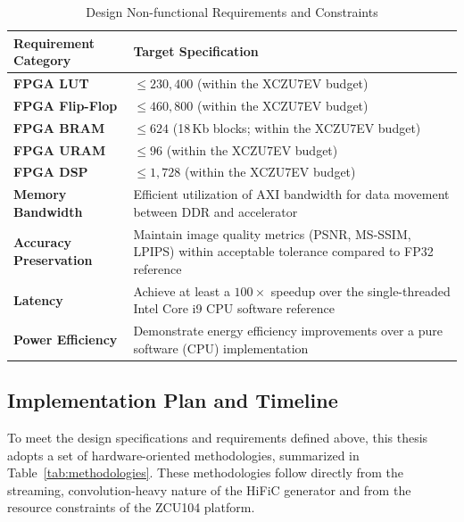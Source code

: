 \begin{table}[H]
\centering
\caption{Design Non-functional Requirements and Constraints}
\label{tab:nonfunctional_req}
\begin{tabularx}{\textwidth}{|>{\raggedright\arraybackslash}p{}|X|}
\hline
\textbf{Requirement Category} & \textbf{Target Specification} \\
\hline
\textbf{FPGA LUT} & $\leq 230{,}400$ (within the XCZU7EV budget) \\
\hline
\textbf{FPGA Flip-Flop} & $\leq 460{,}800$ (within the XCZU7EV budget) \\
\hline
\textbf{FPGA BRAM} & $\leq 624$ (18\,Kb blocks; within the XCZU7EV budget) \\
\hline
\textbf{FPGA URAM} & $\leq 96$ (within the XCZU7EV budget) \\
\hline
\textbf{FPGA DSP} & $\leq 1{,}728$ (within the XCZU7EV budget) \\
\hline
\textbf{Memory Bandwidth} & Efficient utilization of AXI bandwidth for data movement between DDR and accelerator \\
\hline
\textbf{Accuracy Preservation} & Maintain image quality metrics (PSNR, MS-SSIM, LPIPS) within acceptable tolerance compared to FP32 reference \\
\hline
\textbf{Latency} & Achieve at least a $100\times$ speedup over the single-threaded Intel Core i9 CPU software reference \\
\hline
\textbf{Power Efficiency} & Demonstrate energy efficiency improvements over a pure software (CPU) implementation \\
\hline
\end{tabularx}
\end{table}

\subsection{Implementation Plan and Timeline}

To meet the design specifications and requirements defined above, this thesis adopts a set of hardware-oriented methodologies, summarized in Table~\ref{tab:methodologies}. These methodologies follow directly from the streaming, convolution-heavy nature of the HiFiC generator and from the resource constraints of the ZCU104 platform.

